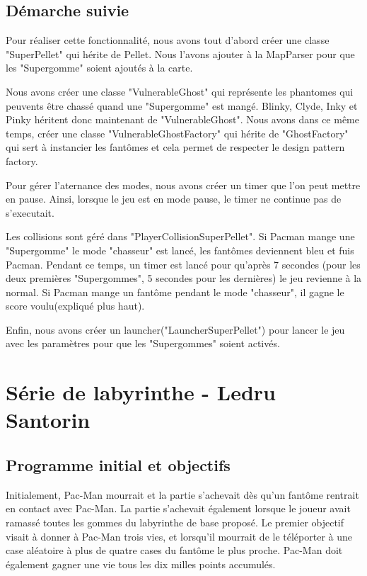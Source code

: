 \documentclass[a4paper,12pt]{report} %
\begin{document}
\subsection{Démarche suivie}
Pour réaliser cette fonctionnalité, nous avons tout d'abord créer une classe "SuperPellet" qui hérite de Pellet. Nous l'avons ajouter à la MapParser pour que les "Supergomme" soient ajoutés à la carte.

Nous avons créer une classe "VulnerableGhost" qui représente les phantomes qui peuvents être chassé quand une "Supergomme" est mangé. Blinky, Clyde, Inky et Pinky héritent donc maintenant de "VulnerableGhost". Nous avons dans ce même temps, créer une classe "VulnerableGhostFactory" qui hérite de "GhostFactory" qui sert à instancier les fantômes et cela permet de respecter le design pattern factory.

Pour gérer l'aternance des modes, nous avons créer un timer que l'on peut mettre en pause. Ainsi, lorsque le jeu est en mode pause, le timer ne continue pas de s'executait.

Les collisions sont géré dans "PlayerCollisionSuperPellet". Si Pacman mange une "Supergomme" le mode "chasseur" est lancé, les fantômes deviennent bleu et fuis Pacman. Pendant ce temps, un timer est lancé pour qu'après 7 secondes (pour les deux premières "Supergommes", 5 secondes pour les dernières) le jeu revienne à la normal. Si Pacman mange un fantôme pendant le mode "chasseur", il gagne le score voulu(expliqué plus haut).

Enfin, nous avons créer un launcher("LauncherSuperPellet") pour lancer le jeu avec les paramètres pour que les "Supergommes" soient activés.

\section{Série de labyrinthe - Ledru Santorin}
\subsection{Programme initial et objectifs}
Initialement, Pac-Man mourrait et la partie s'achevait dès qu'un fantôme
rentrait en contact avec Pac-Man. La partie s'achevait également lorsque
le joueur avait ramassé toutes les gommes du labyrinthe de base proposé.
Le premier objectif visait à donner à Pac-Man trois vies, et lorsqu'il
mourrait de le téléporter à une case aléatoire à plus de quatre cases
du fantôme le plus proche. Pac-Man doit également gagner une vie tous
les dix milles points accumulés.
\end{document}
